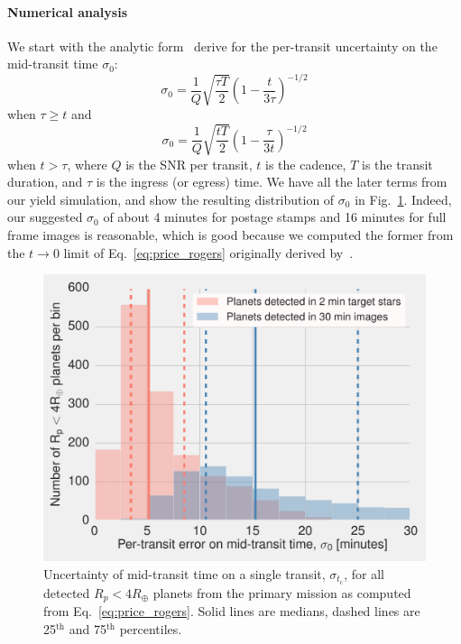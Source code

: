 \paragraph{Numerical analysis}
We start with the analytic form~\citet{price_transit_2014} derive for the per-transit uncertainty on the mid-transit time $\sigma_0$:
$$
\sigma_{0} = \frac{1}{Q} \sqrt{ \frac{\tau T}{2} } \left( 1 - \frac{t}{3\tau} \right)^{-1/2}
$$
when $\tau\geq t$ and 
\begin{equation}
	\sigma_{0} = \frac{1}{Q} \sqrt{\frac{t T }{2}} \left( 1 - \frac{\tau}{3t} \right)^{-1/2}
	\label{eq:price_rogers}
\end{equation}
when $t > \tau$,
where $Q$ is the SNR per transit, $t$ is the cadence, $T$ is the transit duration, and $\tau$ is the ingress (or egress) time.
We have all the later terms from our yield simulation, and show the resulting distribution of $\sigma_0$ in Fig.~\ref{fig:uncertainty_tc_hist}.
Indeed, our suggested $\sigma_0$ of about 4 minutes for postage stamps and 16 minutes for full frame images is reasonable, which is good because we computed the former from the $t\rightarrow0$ limit of Eq.~\ref{eq:price_rogers} originally derived by~\citet{carter_analytic_2008}.
\begin{figure}[!t]
	\centering
	\includegraphics[scale=1.]{figures/mid_transit_time_vs_cadence.pdf}
	\caption{Uncertainty of mid-transit time on a single transit, $\sigma_{t_c}$, for all detected $R_p<4R_\oplus$ planets from the primary mission as computed from Eq.~\protect\ref{eq:price_rogers}.
		Solid lines are medians, dashed lines are 25$^\mathrm{th}$ and 75$^\mathrm{th}$ percentiles.
	}
	\label{fig:uncertainty_tc_hist}
\end{figure}
